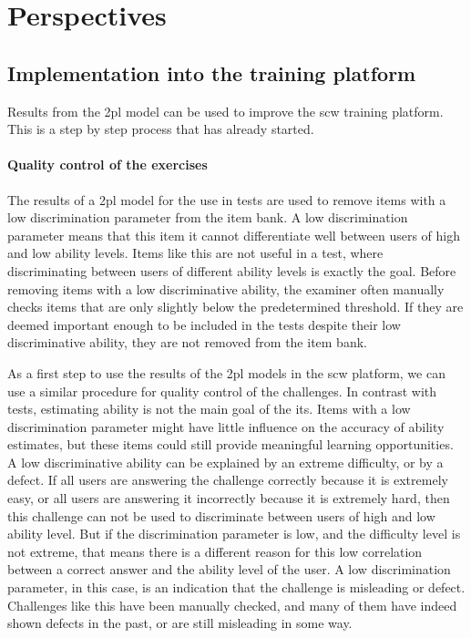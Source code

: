 \section{Perspectives}
\label{sec:its-perspectives}

\subsection{Implementation into the training platform}
Results from the \gls{2pl} model can be used to improve the \gls{scw} training platform.
This is a step by step process that has already started.

\paragraph{Quality control of the exercises}
The results of a \gls{2pl} model for the use in tests are used to remove items with a low discrimination parameter from the item bank. 
A low discrimination parameter means that this item it cannot differentiate well between users of high and low ability levels.
Items like this are not useful in a test, where discriminating between users of different ability levels is exactly the goal.
Before removing items with a low discriminative ability, the examiner often manually checks items that are only slightly below the predetermined threshold.
If they are deemed important enough to be included in the tests despite their low discriminative ability, they are not removed from the item bank.

As a first step to use the results of the \gls{2pl} models in the \gls{scw} platform, we can use a similar procedure for quality control of the challenges.
In contrast with tests, estimating ability is not the main goal of the \gls{its}.
Items with a low discrimination parameter might have little influence on the accuracy of ability estimates, but these items could still provide meaningful learning opportunities.
A low discriminative ability can be explained by an extreme difficulty, or by a defect.
If all users are answering the challenge correctly because it is extremely easy, or all users are answering it incorrectly because it is extremely hard, then this challenge can not be used to discriminate between users of high and low ability level.
But if the discrimination parameter is low, and the difficulty level is not extreme, that means there is a different reason for this low correlation between a correct answer and the ability level of the user.
A low discrimination parameter, in this case, is an indication that the challenge is misleading or defect.
Challenges like this have been manually checked, and many of them have indeed shown defects in the past, or are still misleading in some way.

